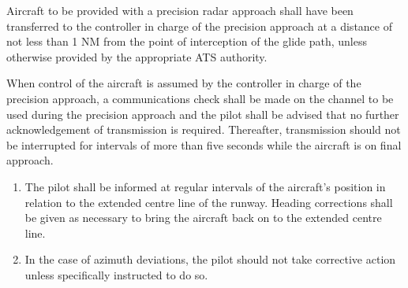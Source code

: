\begin{enumeratesc}
\begin{enumerate}[labelindent=0pt,itemsep=0.2cm]
        \par\noindent Aircraft to be provided with a precision radar approach shall have been transferred to the controller in charge of the precision approach at a distance of not less than 1 NM from the point of interception of the glide path, unless otherwise provided by the appropriate ATS authority.

        \par\noindent When control of the aircraft is assumed by the controller in charge of the precision approach, a communications check shall be made on the channel to be used during the precision approach and the pilot shall be advised that no further acknowledgement of transmission is required. Thereafter, transmission should not be interrupted for intervals of more than five seconds while the aircraft is on final approach.

         \label{8.9.7.2.4}
        \begin{enumerate}
            \item The pilot shall be informed at regular intervals of the aircraft's position in relation to the extended centre line of the runway. Heading corrections shall be given as necessary to bring the aircraft back on to the extended centre line.
            \item In the case of azimuth deviations, the pilot should not take corrective action unless specifically instructed to do so.
        \end{enumerate}


\end{enumerate}
\end{enumeratesc}
